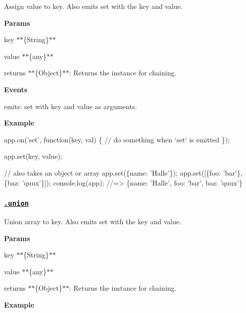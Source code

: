 Assign {\ttfamily value} to {\ttfamily key}. Also emits {\ttfamily set} with the key and value.

{\bfseries Params}


\begin{DoxyItemize}
\item {\ttfamily key} $\ast$$\ast$\{String\}$\ast$$\ast$
\item {\ttfamily value} $\ast$$\ast$\{any\}$\ast$$\ast$
\item {\ttfamily returns} $\ast$$\ast$\{Object\}$\ast$$\ast$\+: Returns the instance for chaining.
\end{DoxyItemize}

{\bfseries Events}


\begin{DoxyItemize}
\item {\ttfamily emits}\+: {\ttfamily set} with {\ttfamily key} and {\ttfamily value} as arguments.
\end{DoxyItemize}

{\bfseries Example}


\begin{DoxyCode}
app.on('set', function(key, val) \{
  // do something when `set` is emitted
\});

app.set(key, value);

// also takes an object or array
app.set(\{name: 'Halle'\});
app.set([\{foo: 'bar'\}, \{baz: 'quux'\}]);
console.log(app);
//=> \{name: 'Halle', foo: 'bar', baz: 'quux'\}
\end{DoxyCode}


\subsubsection*{\href{index.js#L114}{\tt .union}}

Union {\ttfamily array} to {\ttfamily key}. Also emits {\ttfamily set} with the key and value.

{\bfseries Params}


\begin{DoxyItemize}
\item {\ttfamily key} $\ast$$\ast$\{String\}$\ast$$\ast$
\item {\ttfamily value} $\ast$$\ast$\{any\}$\ast$$\ast$
\item {\ttfamily returns} $\ast$$\ast$\{Object\}$\ast$$\ast$\+: Returns the instance for chaining.
\end{DoxyItemize}

{\bfseries Example}


